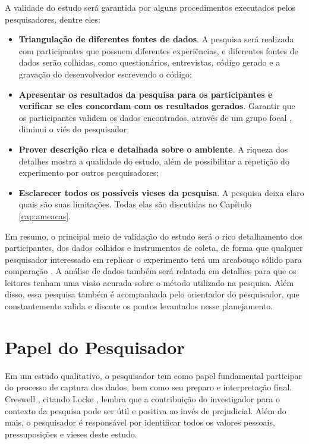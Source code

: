 A validade do estudo será garantida por alguns procedimentos executados pelos
pesquisadores, dentre eles:

\begin{itemize}
	\item \textbf{Triangulação de diferentes fontes de dados}. A pesquisa será
	realizada com participantes que possuem diferentes experiências, e diferentes
	fontes de dados serão colhidas, como questionários, entrevistas, código gerado e 
	a gravação do desenvolvedor escrevendo o código;

	\item \textbf{Apresentar os resultados da pesquisa para os participantes e
	verificar se eles concordam com os resultados gerados}. Garantir que os
	participantes validem os dados encontrados, através de um grupo focal \cite{creswell},
	diminui o viés do pesquisador;

	\item \textbf{Prover descrição rica e detalhada sobre o ambiente}. A riqueza
	dos detalhes mostra a qualidade do estudo, além de possibilitar a repetição do
	experimento por outros pesquisadores;

	\item \textbf{Esclarecer todos os possíveis vieses da pesquisa}. A pesquisa
	deixa claro quais são suas limitações. Todas elas são discutidas no Capítulo
	\ref{cap:ameacas}.

\end{itemize}

Em resumo, o principal meio de validação do estudo será o rico detalhamento dos
participantes, dos dados colhidos e instrumentos de coleta, de forma
que qualquer pesquisador interessado em replicar o experimento terá um
arcabouço sólido para comparação \cite{merriam-1998}. A análise de
dados também será relatada em detalhes para que os leitores tenham uma visão
acurada sobre o método utilizado na pesquisa. 
Além disso, essa pesquisa também é acompanhada pelo orientador do pesquisador,
que constantemente valida e discute os pontos levantados nesse planejamento.

\section{Papel do Pesquisador}
\label{sec:planejamento-papel}

Em um estudo qualitativo, o pesquisador tem como papel fundamental participar do 
processo de captura dos dados, bem como seu preparo e interpretação final.
Creswell \cite{creswell}, citando Locke \cite{locke}, lembra
que a contribuição do investigador para o contexto da pesquisa pode ser útil e
positiva ao invés de prejudicial. Além do mais, o pesquisador é responsável por
identificar todos os valores pessoais, pressuposições e vieses deste estudo.

